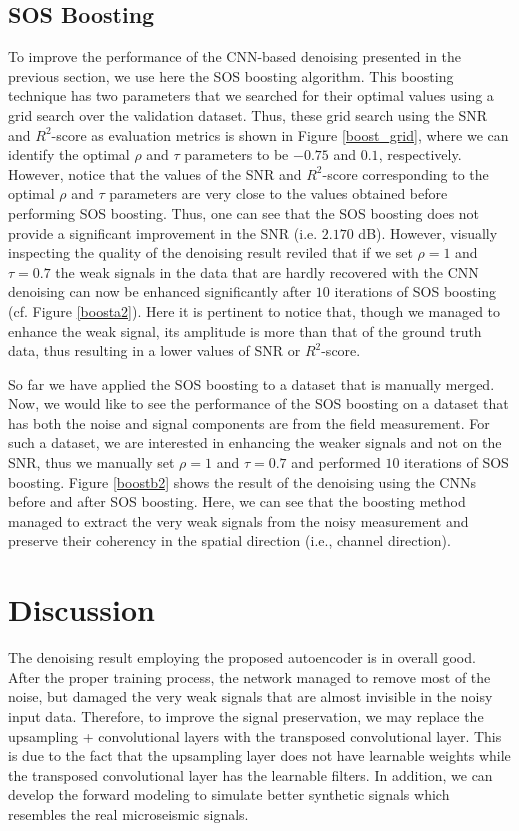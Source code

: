 \documentclass[a4paper]{article}
\begin{document}
\subsection{SOS Boosting}
To improve the performance of the CNN-based denoising presented in the previous section, we use here the SOS boosting algorithm. This boosting technique has two parameters that we searched for their optimal values using a grid search over the validation dataset. Thus, these grid search using the SNR and $R^2$-score as evaluation metrics is shown in Figure \ref{boost_grid}, where we can identify the optimal $\rho$ and $\tau$ parameters to be $-0.75$ and $0.1$, respectively. However, notice that the values of the SNR and $R^2$-score corresponding to the optimal $\rho$ and $\tau$ parameters are very close to the values obtained before performing SOS boosting. Thus, one can see that the SOS boosting does not provide a significant improvement in the SNR (i.e. $2.170$ dB). However, visually inspecting the quality of the denoising result reviled that if we set $\rho=1$ and $\tau=0.7$ the weak signals in the data that are hardly recovered with the CNN denoising can now be enhanced significantly after $10$ iterations of SOS boosting (cf. Figure \ref{boosta2}). Here it is pertinent to notice that, though we managed to enhance the weak signal, its amplitude is more than that of the ground truth data, thus resulting in a lower values of SNR or $R^2$-score. 

So far we have applied the SOS boosting to a dataset that is manually merged. Now, we would like to see the performance of the SOS boosting on a dataset that has both the noise and signal components are from the field measurement. For such a dataset, we are interested in enhancing the weaker signals and not on the SNR, thus we manually set $\rho=1$ and $\tau=0.7$ and performed $10$ iterations of SOS boosting. Figure \ref{boostb2} shows the result of the denoising using the CNNs before and after SOS boosting. Here, we can see that the boosting method managed to extract the very weak signals from the noisy measurement and preserve their coherency in the spatial direction (i.e., channel direction).

\section{Discussion}

The denoising result employing the proposed autoencoder is in overall good. After the proper training process, the network managed to remove most of the noise, but damaged the very weak signals that are almost invisible in the noisy input data. Therefore, to improve the signal preservation, we may replace the upsampling + convolutional layers with the transposed convolutional layer. This is due to the fact that the upsampling layer does not have learnable weights while the transposed convolutional layer has the learnable filters. In addition, we can develop the forward modeling to simulate better synthetic signals which resembles the real microseismic signals.
\end{document}
